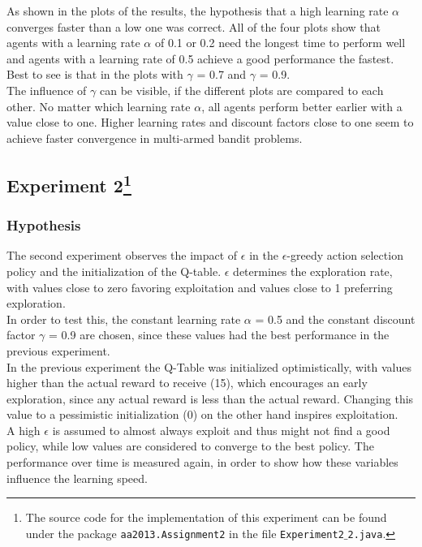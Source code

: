 \documentclass[11pt]{article}
\begin{document}
As shown in the plots of the results, the hypothesis that a high learning rate $\alpha$ converges faster than a low one was correct. All of the four plots show that agents with a learning rate $\alpha$ of 0.1 or 0.2 need the longest time to perform well and agents with a learning rate of 0.5 achieve a good performance the fastest. Best to see is that in the plots with $\gamma$ = 0.7 and $\gamma$ = 0.9.\\
The influence of $\gamma$ can be visible, if the different plots are compared to each other. No matter which learning rate $\alpha$, all agents perform better earlier with a value close to one.
Higher learning rates and discount factors close to one seem to achieve faster convergence in multi-armed bandit problems.


\subsection[title]{Experiment 2\footnote{The source code for the implementation of this experiment can be found under the package \texttt{aa2013.Assignment2} in the file \texttt{Experiment2$\_$2.java}.}}

\subsubsection{Hypothesis}
The second experiment observes the impact of $\epsilon$ in the $\epsilon$-greedy action selection policy and the initialization of the Q-table. $\epsilon$ determines the exploration rate, with values close to zero favoring exploitation and values close to 1 preferring exploration.\\
In order to test this, the constant learning rate $\alpha$ = 0.5 and the constant discount factor $\gamma$ = 0.9 are chosen, since these values had the best performance in the previous experiment.\\
In the previous experiment the Q-Table was initialized optimistically, with values higher than the actual reward to receive (15), which encourages an early exploration, since any actual reward is less than the actual reward. Changing this value to a pessimistic initialization (0) on the other hand inspires exploitation.\\
A high $\epsilon$ is assumed to almost always exploit and thus might not find a good policy, while low values are considered to converge to the best policy.
The performance over time is measured again, in order to show how these variables influence the learning speed.
\end{document}
